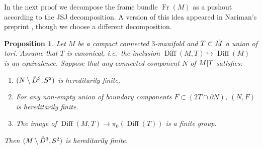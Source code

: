 \documentclass{amsart}
\theoremstyle{plain}
\newtheorem{prop}[thm]{Proposition}
\theoremstyle{definition}
\DeclareMathOperator\Diff{Diff}
\DeclareMathOperator\Fr{Fr}
\newcommand{\interior}[1]{\smash{\mathring{#1}}}
\newcommand{\ca}{\smash{\mid}} %
\begin{document}
In the next proof we decompose the frame bundle $\Fr(M)$ as a pushout according to the JSJ decomposition. A version of this idea appeared in Nariman's preprint \cite{Nariman}, though we choose a different decomposition.


\begin{prop}\label{prop:cut-along-tori}
    Let $M$ be a compact connected $3$-manifold and $T \subset \interior{M}$ a union of tori.
    Assume that $T$ is canonical, i.e.~the inclusion $\Diff(M, T) \hookrightarrow \Diff(M)$ is an equivalence.
    Suppose that any connected component $N$ of $M \ca T$ satisfies:
    \begin{enumerate}
        \item 
        $(N \setminus \interior{D}^3, S^2)$ is hereditarily finite.
        \item
        For any non-empty union of boundary components $F \subset (2T \cap \partial N)$,
        $(N, F)$ is hereditarily finite. 
        \item The image of $\Diff(M, T) \to \pi_0(\Diff(T))$ is a finite group.
    \end{enumerate}
    Then $(M \setminus \interior{D}^3, S^2)$ is hereditarily finite.
\end{prop}
\end{document}
